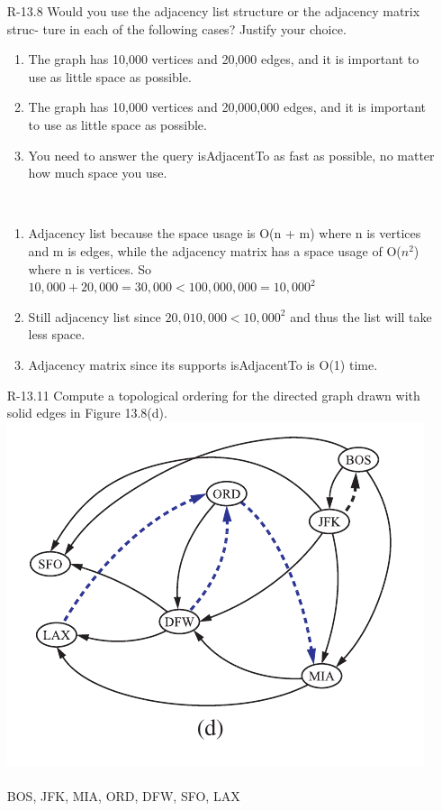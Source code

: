 \begin{itemize}
      \item[R-13.8] Would you use the adjacency list structure or the adjacency matrix struc-
            ture in each of the following cases? Justify your choice.
            \begin{enumerate}[label=\alph*.]
                  \item  The graph has 10,000 vertices and 20,000 edges, and it is important
                        to use as little space as possible.
                  \item The graph has 10,000 vertices and 20,000,000 edges, and it is important to use as little space as possible.
                  \item You need to answer the query isAdjacentTo as fast as possible, no
                        matter how much space you use.
            \end{enumerate}
            \answer \\
            \begin{enumerate}[label=\alph*.]
                  \item Adjacency list because the space usage is O(n + m) where n is vertices and m is edges, while the adjacency
                        matrix has a space usage of O($n^2$) where n is vertices. So $10,000+20,000= 30,000 < 100,000,000=10,000^2$
                  \item Still adjacency list since $20,010,000 < 10,000^2$ and thus the list will take less space.
                  \item Adjacency matrix since its supports isAdjacentTo is O(1) time.
            \end{enumerate}
            \newpage
      \item[R-13.11] Compute a topological ordering for the directed graph drawn with solid
            edges in Figure 13.8(d).\\
            \includegraphics[scale=0.7]{img/figure_13_8_d.png} \\
            \answer\\
            BOS, JFK, MIA, ORD, DFW, SFO, LAX


\end{itemize}
